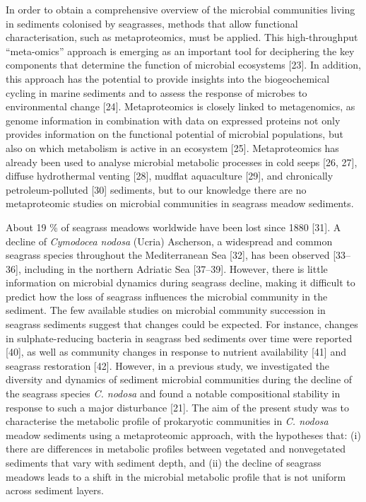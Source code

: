 \documentclass[
  12 pt,
]{article}
\begin{document}
In order to obtain a comprehensive overview of the microbial communities living in sediments colonised by seagrasses, methods that allow functional characterisation, such as metaproteomics, must be applied. This high-throughput ``meta-omics'' approach is emerging as an important tool for deciphering the key components that determine the function of microbial ecosystems {[}23{]}. In addition, this approach has the potential to provide insights into the biogeochemical cycling in marine sediments and to assess the response of microbes to environmental change {[}24{]}. Metaproteomics is closely linked to metagenomics, as genome information in combination with data on expressed proteins not only provides information on the functional potential of microbial populations, but also on which metabolism is active in an ecosystem {[}25{]}. Metaproteomics has already been used to analyse microbial metabolic processes in cold seeps {[}26, 27{]}, diffuse hydrothermal venting {[}28{]}, mudflat aquaculture {[}29{]}, and chronically petroleum-polluted {[}30{]} sediments, but to our knowledge there are no metaproteomic studies on microbial communities in seagrass meadow sediments.

About 19 \si{\percent} of seagrass meadows worldwide have been lost since 1880 {[}31{]}. A decline of \emph{Cymodocea nodosa} (Ucria) Ascherson, a widespread and common seagrass species throughout the Mediterranean Sea {[}32{]}, has been observed {[}33--36{]}, including in the northern Adriatic Sea {[}37--39{]}. However, there is little information on microbial dynamics during seagrass decline, making it difficult to predict how the loss of seagrass influences the microbial community in the sediment. The few available studies on microbial community succession in seagrass sediments suggest that changes could be expected. For instance, changes in sulphate-reducing bacteria in seagrass bed sediments over time were reported {[}40{]}, as well as community changes in response to nutrient availability {[}41{]} and seagrass restoration {[}42{]}. However, in a previous study, we investigated the diversity and dynamics of sediment microbial communities during the decline of the seagrass species \emph{C. nodosa} and found a notable compositional stability in response to such a major disturbance {[}21{]}. The aim of the present study was to characterise the metabolic profile of prokaryotic communities in \emph{C. nodosa} meadow sediments using a metaproteomic approach, with the hypotheses that: (i) there are differences in metabolic profiles between vegetated and nonvegetated sediments that vary with sediment depth, and (ii) the decline of seagrass meadows leads to a shift in the microbial metabolic profile that is not uniform across sediment layers.
\end{document}
